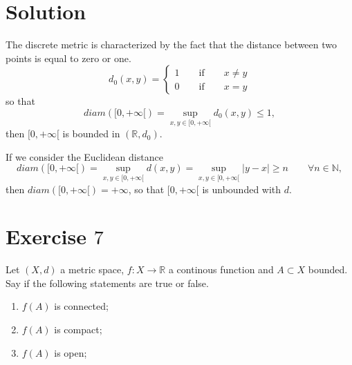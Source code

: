 \documentclass[a4paper, twoside, openany]{book}
\begin{document}
\section*{Solution}
The discrete metric is characterized by the fact that the distance between two points is equal to zero or one.
$$d_0(x,y) = \begin{cases}
			1 \qquad \textrm{if} \qquad x \neq y \\
			0 \qquad \textrm{if} \qquad x = y
			\end{cases}$$
so that
$$diam([0, +\infty[) = \sup_{x,y \in [0, +\infty[} d_0(x, y) \leq 1,$$
then $[0, +\infty[$ is bounded in $(\mathbb{R}, d_0)$. \par 
If we consider the Euclidean distance
$$diam([0, +\infty[) = \sup_{x, y \in [0, +\infty[} d(x, y) = \sup_{x, y \in [0, +\infty[} |y - x| \geq n \qquad \forall n \in \mathbb{N},$$
then $diam([0, +\infty[) = + \infty$, so that $[0, +\infty[$ is unbounded with $d$.
\clearpage
\section*{Exercise $7$}
Let $(X, d)$ a metric space, $f: X \rightarrow \mathbb{R}$ a continous function and $A \subset X$ bounded. Say if the following statements are true or false.
\begin{enumerate}
\item $f(A)$ is connected;
\item $f(A)$ is compact;
\item $f(A)$ is open;
\end{enumerate}
\end{document}
